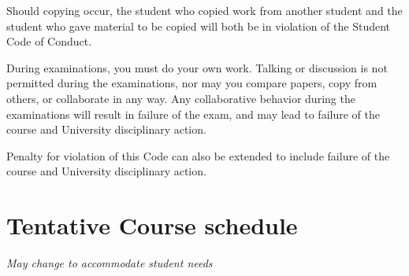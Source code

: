 \documentclass[a4paper]{article}
\begin{document}
Should copying occur, the student who copied work from another student and the student who gave material to be copied will both be in violation of the Student Code of Conduct. 

During examinations, you must do your own work. Talking or discussion is not permitted during the examinations, nor may you compare papers, copy from others, or collaborate in any way. Any collaborative behavior during the examinations will result in failure of the exam, and may lead to failure of the course and University disciplinary action.

Penalty for violation of this Code can also be extended to include failure of the course and University disciplinary action. 


\section{Tentative Course schedule}
{\it May change to accommodate student needs}\\
\end{document}
